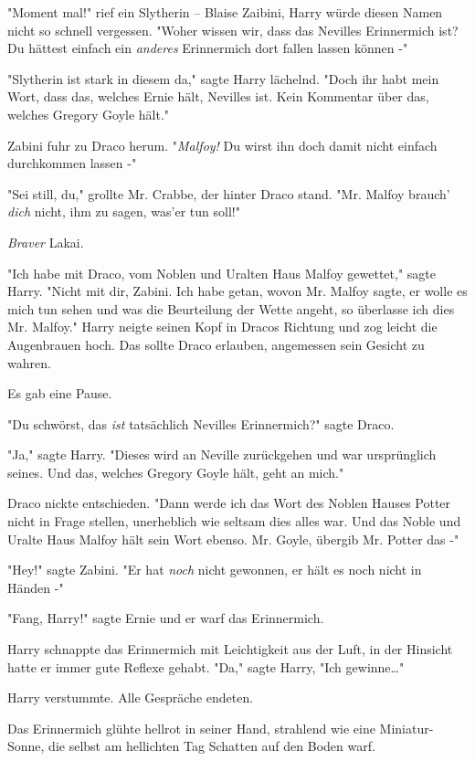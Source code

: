 {"Moment mal!" rief ein Slytherin -- Blaise Zaibini, Harry würde diesen Namen nicht so schnell vergessen. "Woher wissen wir, dass das Nevilles Erinnermich ist? Du hättest einfach ein \emph{anderes} Erinnermich dort fallen lassen können -"

"Slytherin ist stark in diesem da," sagte Harry lächelnd. "Doch ihr habt mein Wort, dass das, welches Ernie hält, Nevilles ist. Kein Kommentar über das, welches Gregory Goyle hält."

Zabini fuhr zu Draco herum. "\emph{Malfoy!} Du wirst ihn doch damit nicht einfach durchkommen lassen -"

"Sei still, du," grollte Mr. Crabbe, der hinter Draco stand. "Mr. Malfoy brauch' \emph{dich} nicht, ihm zu sagen, was'er tun soll!"

\emph{Braver} Lakai.

"Ich habe mit Draco, vom Noblen und Uralten Haus Malfoy gewettet," sagte Harry. "Nicht mit dir, Zabini. Ich habe getan, wovon Mr. Malfoy sagte, er wolle es mich tun sehen und was die Beurteilung der Wette angeht, so überlasse ich dies Mr. Malfoy." Harry neigte seinen Kopf in Dracos Richtung und zog leicht die Augenbrauen hoch. Das sollte Draco erlauben, angemessen sein Gesicht zu wahren.

Es gab eine Pause.

"Du schwörst, das \emph{ist} tatsächlich Nevilles Erinnermich?" sagte Draco.

"Ja," sagte Harry. "Dieses wird an Neville zurückgehen und war ursprünglich seines. Und das, welches Gregory Goyle hält, geht an mich."

Draco nickte entschieden. "Dann werde ich das Wort des Noblen Hauses Potter nicht in Frage stellen, unerheblich wie seltsam dies alles war. Und das Noble und Uralte Haus Malfoy hält sein Wort ebenso. Mr. Goyle, übergib Mr. Potter das -"

"Hey!" sagte Zabini. "Er hat \emph{noch} nicht gewonnen, er hält es noch nicht in Händen -"

"Fang, Harry!" sagte Ernie und er warf das Erinnermich.

Harry schnappte das Erinnermich mit Leichtigkeit aus der Luft, in der Hinsicht hatte er immer gute Reflexe gehabt. "Da," sagte Harry, "Ich gewinne…"

Harry verstummte. Alle Gespräche endeten.

Das Erinnermich glühte hellrot in seiner Hand, strahlend wie eine Miniatur-Sonne, die selbst am hellichten Tag Schatten auf den Boden warf.

}
